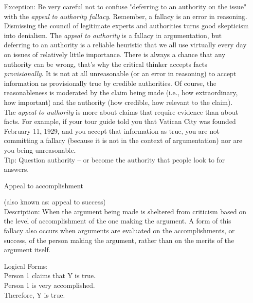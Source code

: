 \documentclass[a4paper,12pt,single,pdftex]{scrbook}
\begin{document}
{    
      Exception: Be very careful not to confuse "deferring to an authority on the issue" with the {\it appeal to authority fallacy}. Remember, a fallacy is an error in reasoning. Dismissing the council of legitimate experts and authorities turns good skepticism into denialism. The {\it appeal to authority} is a fallacy in argumentation, but deferring to an authority is a reliable heuristic that we all use virtually every day on issues of relatively little importance. There is always a chance that any authority can be wrong, that’s why the critical thinker accepts facts {\it provisionally}. It is not at all unreasonable (or an error in reasoning) to accept information as provisionally true by credible authorities. Of course, the reasonableness is moderated by the claim being made (i.e., how extraordinary, how important) and the authority (how credible, how relevant to the claim).
    \\

    
      The {\it appeal to authority} is more about claims that require evidence than about facts. For example, if your tour guide told you that Vatican City was founded February 11, 1929, and you accept that information as true, you are not committing a fallacy (because it is not in the context of argumentation) nor are you being unreasonable.
    \\

    
      Tip: Question authority -- or become the authority that people look to for answers.
    \\

  }


Appeal to accomplishment
    
      (also known as: appeal to success)
    \\

  
    Description: When the argument being made is sheltered from criticism based on the level of accomplishment of the one making the argument.  A form of this fallacy also occurs when arguments are evaluated on the accomplishments, or success, of the person making the argument, rather than on the merits of the argument itself.

    
      Logical Forms:
    \\

    
      Person 1 claims that Y is true.
    \\

    
      Person 1 is very accomplished.
    \\

    
      Therefore, Y is true.
    \\
\end{document}
